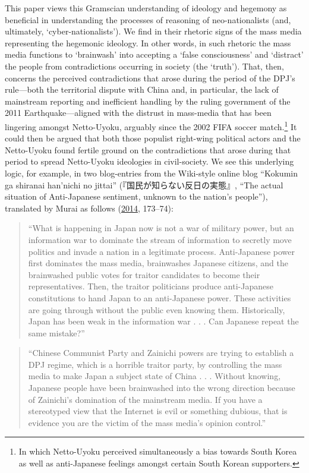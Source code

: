 \documentclass[10pt,british,A4paper,oneside]{memoir}
\begin{document}
This paper views this Gramscian understanding of ideology and hegemony
as beneficial in understanding the processes of reasoning of
neo-nationalists (and, ultimately, `cyber-nationalists'). We find in
their rhetoric signs of the mass media representing the hegemonic
ideology. In other words, in such rhetoric the mass media functions to
`brainwash' into accepting a `false consciousness' and `distract' the people from
contradictions occurring in society (the `truth'). That, then,
concerns the perceived contradictions that arose during the period of
the DPJ's rule---both the territorial dispute with China and, in
particular, the lack of mainstream reporting and inefficient handling by
the ruling government of the 2011 Earthquake---aligned with the distrust
in mass-media that has been lingering amongst Netto-Uyoku, arguably
since the 2002 FIFA soccer match.\footnote{In which Netto-Uyoku
  perceived simultaneously a bias towards South Korea as well as
  anti-Japanese feelings amongst certain South Korean supporters.} It could then
be argued that both those populist right-wing political actors and the
Netto-Uyoku found fertile ground on the contradictions that arose during
that period to spread Netto-Uyoku ideologies in civil-society. We see
this underlying logic, for example, in two blog-entries from the
Wiki-style online blog ``Kokumin ga shiranai han'nichi no jittai''
(『国民が知らない反日の実態』, ``The actual situation of Anti-Japanese
sentiment, unknown to the nation's people''), translated by Murai as
follows (\protect\hyperlink{ref-hollihan_how_2014}{2014}, 173--74):

\begin{quote}
``What is happening in Japan now is not a war of military power, but an
information war to dominate the stream of information to secretly move
politics and invade a nation in a legitimate process. Anti-Japanese
power first dominates the mass media, brainwashes Japanese citizens, and
the brainwashed public votes for traitor candidates to become their
representatives. Then, the traitor politicians produce anti-Japanese
constitutions to hand Japan to an anti-Japanese power. These activities
are going through without the public even knowing them. Historically,
Japan has been weak in the information war . . . Can Japanese repeat the
same mistake?''
\end{quote}

\begin{quote}
``Chinese Communist Party and Zainichi powers are trying to establish a
DPJ regime, which is a horrible traitor party, by controlling the mass
media to make Japan a subject state of China . . . Without knowing,
Japanese people have been brainwashed into the wrong direction because
of Zainichi's domination of the mainstream media. If you have a
stereotyped view that the Internet is evil or something dubious, that is
evidence you are the victim of the mass media's opinion control.''
\end{quote}
\end{document}
